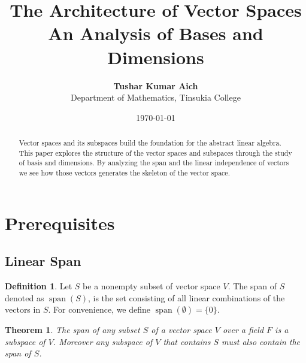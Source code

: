 \documentclass[12pt, a4paper]{article}
\title{\textbf{\Large The Architecture of Vector Spaces \\ \large An Analysis of Bases and Dimensions}}
\author{\textbf{Tushar Kumar Aich} \\ \small{Department of Mathematics, Tinsukia College}}
\date{\today}
\newtheorem{theorem}{Theorem}[section]
\theoremstyle{definition}
\newtheorem{definition}{Definition}[section]
\theoremstyle{remark}
\DeclareMathOperator{\Span}{span}
\begin{document}
\maketitle
\begin{abstract}
    Vector spaces and its subspaces build the foundation for the abstract linear algebra. This paper explores the structure of the vector spaces and subspaces through the study of basis and dimensions. By analyzing the span and the linear independence of vectors we see how those vectors generates the skeleton of the vector space.
\end{abstract}

\section{Prerequisites}
\subsection{Linear Span}
\begin{definition}
    Let $S$ be a nonempty subset of vector space $V$. The span of $S$ denoted as $\Span(S)$, is the set consisting of all linear combinations of the vectors in $S$. For convenience, we define $\Span(\emptyset) = \{0\}$.
\end{definition}

\begin{theorem}
    The span of any subset $S$ of a vector space $V$ over a field $F$ is a subspace of $V$. Moreover any subspace of $V$ that contains $S$ must also contain the span of $S$.
\end{theorem}
\end{document}
